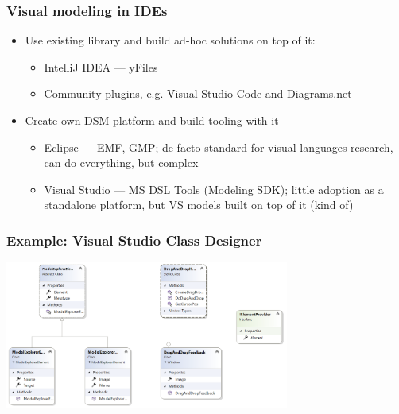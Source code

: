 \documentclass{slides-style}
\begin{document}
    \begin{frame}
        \frametitle{Visual modeling in IDEs}
        \begin{itemize}
            \item Use existing library and build ad-hoc solutions on top of it:
            \begin{itemize}
                \item IntelliJ IDEA --- yFiles
                \item Community plugins, e.g. Visual Studio Code and Diagrams.net
            \end{itemize}
            \item Create own DSM platform and build tooling with it
            \begin{itemize}
                \item Eclipse --- EMF, GMP; de-facto standard for visual languages research, can do everything, but complex 
                \item Visual Studio --- MS DSL Tools (Modeling SDK); little adoption as a standalone platform, but VS models built on top of it (kind of)
            \end{itemize}
        \end{itemize}
    \end{frame}

    \begin{frame}
        \frametitle{Example: Visual Studio Class Designer}
        \begin{center}
            \includegraphics[width=0.7\textwidth]{visual-studio.png}
        \end{center}
    \end{frame}
\end{document}
